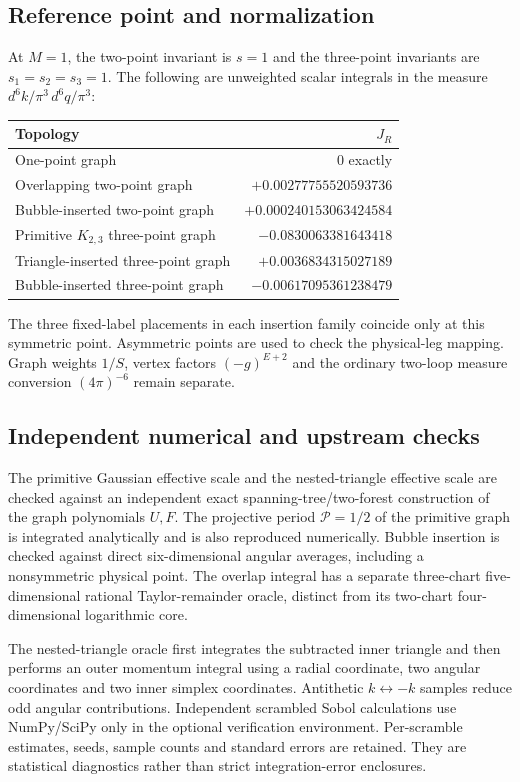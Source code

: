 \subsection{Reference point and normalization}
At $M=1$, the two-point invariant is $s=1$ and the three-point invariants
are $s_1=s_2=s_3=1$. The following are unweighted scalar integrals in the
measure $d^6k/\pi^3\,d^6q/\pi^3$:
\begin{center}
\begin{tabular}{lr}
\toprule Topology & $J_R$\\\midrule
One-point graph & $0$ exactly\\
Overlapping two-point graph & $+0.00277755520593736$\\
Bubble-inserted two-point graph & $+0.000240153063424584$\\
Primitive $K_{2,3}$ three-point graph & $-0.0830063381643418$\\
Triangle-inserted three-point graph & $+0.0036834315027189$\\
Bubble-inserted three-point graph & $-0.00617095361238479$\\
\bottomrule
\end{tabular}
\end{center}
The three fixed-label placements in each insertion family coincide only at
this symmetric point. Asymmetric points are used to check the physical-leg
mapping. Graph weights $1/S$, vertex factors $(-g)^{E+2}$ and the ordinary
two-loop measure conversion $(4\pi)^{-6}$ remain separate.

\subsection{Independent numerical and upstream checks}
The primitive Gaussian effective scale and the nested-triangle effective
scale are checked against an independent exact spanning-tree/two-forest
construction of the graph polynomials $U,F$. The projective period
$\mathcal P=1/2$ of the primitive graph is integrated analytically and is
also reproduced numerically. Bubble insertion is checked against direct
six-dimensional angular averages, including a nonsymmetric physical point.
The overlap integral has a separate three-chart five-dimensional rational
Taylor-remainder oracle, distinct from its two-chart four-dimensional
logarithmic core.

The nested-triangle oracle first integrates the subtracted inner triangle
and then performs an outer momentum integral using a radial coordinate,
two angular coordinates and two inner simplex coordinates. Antithetic
$k\leftrightarrow-k$ samples reduce odd angular contributions. Independent
scrambled Sobol calculations use NumPy/SciPy only in the optional
verification environment. Per-scramble estimates, seeds, sample counts and
standard errors are retained. They are statistical diagnostics rather than
strict integration-error enclosures.

